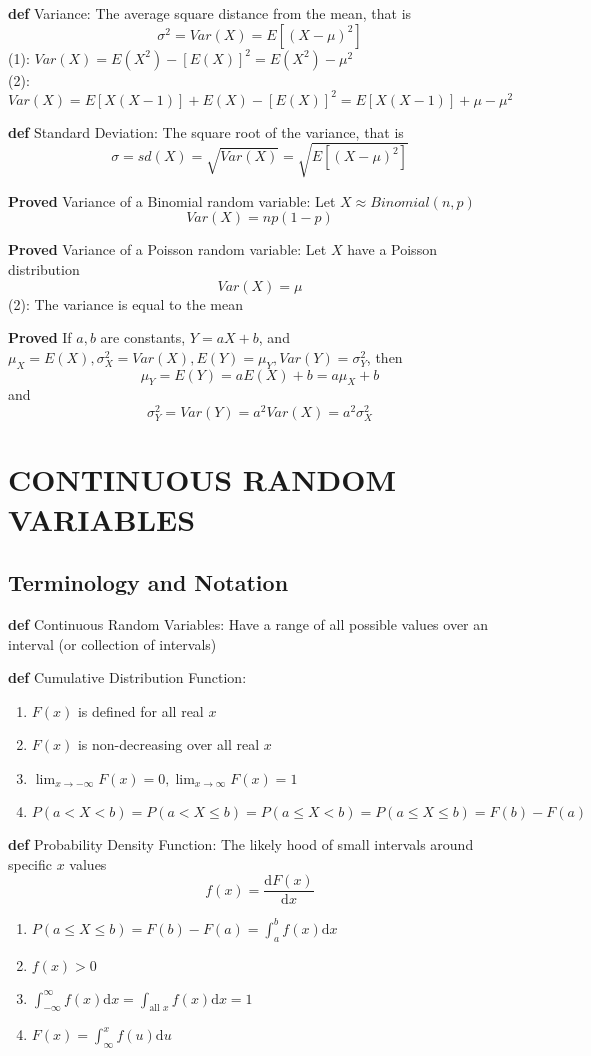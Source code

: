 \documentclass[11pt,notitlepage]{report}
\begin{document}
\textbf{def} Variance: The average square distance from the mean, that is
$$\sigma^2 = Var(X) = E\left[(X - \mu)^2\right]$$
\hspace*{5mm} (1): $Var(X) = E(X^2) - [E(X)]^2 = E(X^2) - \mu^2$\\
\hspace*{5mm} (2): $Var(X) = E[X(X-1)] + E(X)-[E(X)]^2 = E[X(X-1)] + \mu - \mu^2$

\textbf{def} Standard Deviation: The square root of the variance, that is
$$\sigma = sd(X) = \sqrt{Var(X)} = \sqrt{E\left[(X-\mu)^2\right]}$$

\textbf{Proved} Variance of a Binomial random variable: Let $X \approx Binomial(n, p)$
$$Var(X) = np(1-p)$$

\textbf{Proved} Variance of a Poisson random variable: Let $X$ have a Poisson distribution
$$Var(X) = \mu$$
\hspace*{5mm} (2): The variance is equal to the mean

\textbf{Proved} If $a, b$ are constants, $Y = aX + b$, and $\mu_X = E(X), \sigma_X^2 = Var(X), E(Y) = \mu_Y, Var(Y) = \sigma_Y^2$, then
$$\mu_Y = E(Y) = aE(X) + b = a\mu_X + b$$
and
$$\sigma_Y^2 = Var(Y) = a^2Var(X) = a^2 \sigma_X^2$$



\chapter{CONTINUOUS RANDOM VARIABLES}

\section{Terminology and Notation}

\textbf{def} Continuous Random Variables: Have a range of all possible values over an interval (or collection of intervals)

\textbf{def} Cumulative Distribution Function: 
\begin{enumerate}
    \item $F(x)$ is defined for all real $x$
    \item $F(x)$ is non-decreasing over all real $x$
    \item $\lim_{x \to -\infty} F(x) = 0, \lim_{x \to \infty} F(x) = 1$
    \item $P(a < X < b) = P(a < X \leq b) = P(a \leq X < b) = P(a \leq X \leq b) = F(b) - F(a)$
\end{enumerate}

\textbf{def} Probability Density Function: The likely hood of small intervals around specific $x$ values
$$f(x) = \frac{\mathrm{d}F(x)}{\mathrm{d}x}$$
\begin{enumerate}
    \item $P(a \leq X \leq b) = F(b) - F(a) = \int_a^b f(x) \mathrm{d}x$
    \item $f(x) > 0$
    \item $\int_{-\infty}^\infty f(x) \mathrm{d}x = \int_{\text{all }x}f(x) \mathrm{d}x = 1$
    \item $F(x) = \int_{\infty}^x f(u) \mathrm{d}u$
\end{enumerate}
\end{document}
